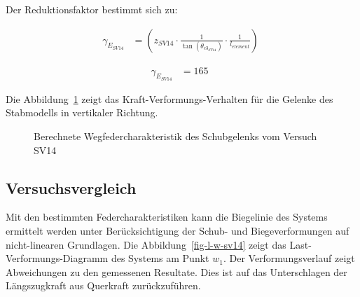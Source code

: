\documentclass[
  10pt,
  letterpaper,
]{scrreprt}
\begin{document}
Der Reduktionsfaktor bestimmt sich zu:

$$
\begin{aligned}
\gamma_{E_{SV14}} &= \left( z_{SV14} \cdot \frac{ 1 }{ \tan \left( \theta_{c3_{SV14}} \right) } \cdot \frac{1} { l_{element} } \right) \; 
\end{aligned}
$$

$$
\begin{aligned}
\gamma_{E_{SV14}} &= 165\ \;
\end{aligned}
$$

Die Abbildung~\ref{fig-wegfeder-schub-sv14} zeigt das
Kraft-Verformungs-Verhalten für die Gelenke des Stabmodells in
vertikaler Richtung.

\begin{figure}[H]


\caption{\label{fig-wegfeder-schub-sv14}Berechnete
Wegfedercharakteristik des Schubgelenks vom Versuch SV14}

\end{figure}%

\subsection{Versuchsvergleich}\label{versuchsvergleich-1}

Mit den bestimmten Federcharakteristiken kann die Biegelinie des Systems
ermittelt werden unter Berücksichtigung der Schub- und Biegeverformungen
auf nicht-linearen Grundlagen. Die Abbildung~\ref{fig-l-w-sv14} zeigt
das Last-Verformungs-Diagramm des Systems am Punkt \(w_1\). Der
Verformungsverlauf zeigt Abweichungen zu den gemessenen Resultate. Dies
ist auf das Unterschlagen der Längszugkraft aus Querkraft
zurückzuführen.
\end{document}

